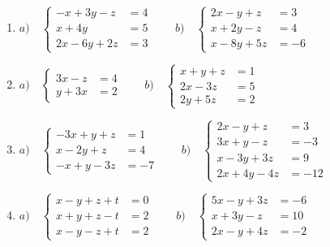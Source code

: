 \begin{enumerate}
\item $a) \quad \begin{cases} -x+3y-z&=4\\x+4y&=5\\2x-6y+2z&=3  \end{cases}  \qquad b) \quad \begin{cases} 2x-y+z&=3\\x+2y-z&=4\\x-8y+5z&=-6 \end{cases}$

\rightline{\textcolor{gris}{Solución: $a)\quad SI; \qquad b) \quad (2-\lambda/5, 1+3\lambda/5,\lambda); \; SCI$  }}

\item $a) \quad \begin{cases} 3x-z&=4\\y+3x&=2 \end{cases} \qquad b) \quad \begin{cases} x+y+z&=1\\2x-3z&=5\\2y+5z&=2 \end{cases}$


\item $a) \quad \begin{cases} -3x+y+z&=1\\x-2y+z&=4\\-x+y-3z&=-7 \end{cases} \qquad b) \quad \begin{cases}2x-y+z&=3\\3x+y-z&=-3\\x-3y+3z&=9\\2x+4y-4z&=-12  \end{cases}$ 

\rightline{\textcolor{gris}{Solución: $a) \quad (0,1,-2); \; SCD \qquad b) \quad (2, \lambda -3, \lambda) \; \; SCI$ }}



\item $a) \quad \begin{cases}  x-y+z+t &= 0\\x+y+z-t &= 2\\x-y-z+t &= 2 \end{cases} \qquad b) \quad \begin{cases} 5x-y+3z &= -6\\x+3y-z &= 10\\2x-y+4z & =-2 \end{cases}$


\end{enumerate}
